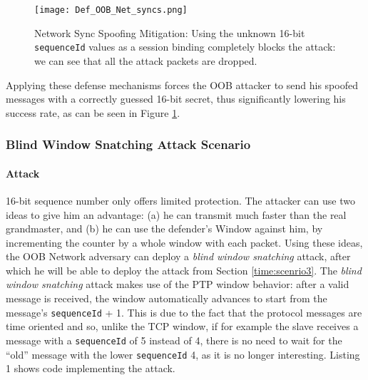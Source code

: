\documentclass[11pt]{article}
\begin{document}
\begin{figure}[t]

\centerline{\texttt{[image: Def\_OOB\_Net\_syncs.png]}}

\caption{Network Sync Spoofing Mitigation: Using the unknown 16-bit \texttt{sequenceId} values as a session binding completely blocks the attack: we can see that all the attack packets are dropped.}

\label{Def Net Syncs}

\end{figure}



Applying these defense mechanisms forces the OOB attacker to send his spoofed messages with a correctly guessed 16-bit secret, thus significantly lowering his success rate, as can be seen in Figure \ref{Def Net Syncs}.



\subsubsection{Blind Window Snatching Attack Scenario}\label{time:scenrio4}

\paragraph{Attack}

16-bit sequence number only offers limited protection. The attacker can use two ideas to give him an advantage: (a) he can transmit much faster than the real grandmaster, and (b) he can use the defender's Window against him, by incrementing the counter by a whole window with each packet. Using these ideas, the OOB Network adversary can deploy a \emph{blind window snatching} attack, after which he will be able to deploy the attack from Section \ref{time:scenrio3}. The \emph{blind window snatching} attack makes use of the PTP window behavior: after a valid message is received, the window automatically advances to start from the message's \texttt{sequenceId} + 1. This is due to the fact that the protocol messages are time oriented and so, unlike the TCP window, if for example the slave receives a message with a \texttt{sequenceId} of 5 instead of 4, there is no need to wait for the ``old'' message with the lower \texttt{sequenceId} 4, as it is no longer interesting. Listing 1 shows code implementing the attack.



\renewcommand{\ttdefault}{pcr}
\end{document}
